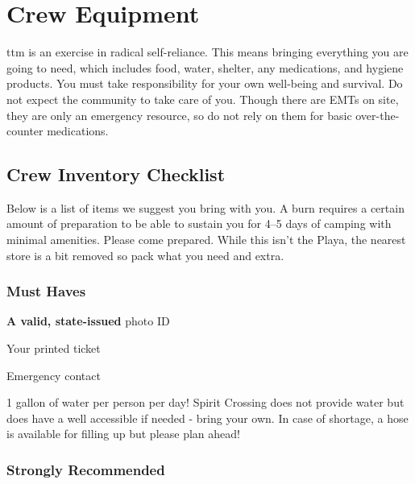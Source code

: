 \section*{Crew Equipment}
\gls{ttm} is an exercise in radical self-reliance.  This means bringing everything you are going to need, which includes food, water, shelter, any medications, and hygiene products.  You must take responsibility for your own well-being and survival.  Do not expect the community to take care of you.  Though there are EMTs on site, they are only an emergency resource, so do not rely on them for basic over-the-counter medications.

\subsection*{Crew Inventory Checklist}
Below is a list of items we suggest you bring with you.  A burn requires a certain amount of preparation to be able to sustain you for 4--5 days of camping with minimal amenities. Please come prepared.  While this isn't the Playa, the nearest store is a bit removed so pack what you need and extra.  


\subsubsection*{Must Haves}

\begin{multicols}{2}

\begin{checklist}
	\item \textbf{A valid, state-issued} photo ID
    \item Your printed ticket
    \item Emergency contact
    \item 1 gallon of water per person per day!  Spirit Crossing does not provide water but does have a well accessible if needed - bring your own. In case of shortage, a hose is available for filling up but please plan ahead!
\end{checklist}
\end{multicols}

\subsubsection*{Strongly Recommended}


